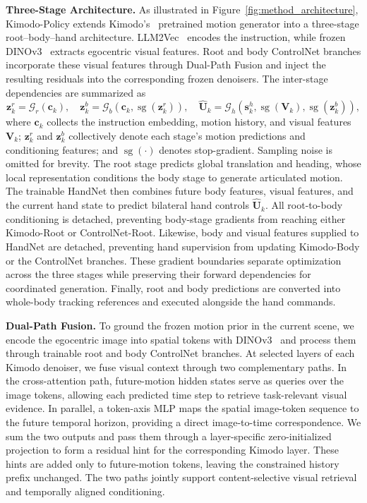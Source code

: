 \textbf{Three-Stage Architecture.}
As illustrated in Figure~\ref{fig:method_architecture}, Kimodo-Policy extends Kimodo's~\citep{kimodo} pretrained motion generator into a three-stage root--body--hand architecture.
LLM2Vec~\citep{behnamghader2024llm2veclargelanguagemodels} encodes the instruction, while frozen DINOv3~\citep{dinov3} extracts egocentric visual features.
Root and body ControlNet branches incorporate these visual features through Dual-Path Fusion and inject the resulting residuals into the corresponding frozen denoisers.
The inter-stage dependencies are summarized as
\begin{equation}
\mathbf{z}^{r}_k = \mathcal{G}_{r}(\mathbf{c}_k),
\quad
\mathbf{z}^{b}_k = \mathcal{G}_{b}\!\left(\mathbf{c}_k,\operatorname{sg}(\mathbf{z}^{r}_k)\right),
\quad
\widehat{\mathbf{U}}_k = \mathcal{G}_{h}\!\left(\mathbf{s}^{h}_k,\operatorname{sg}(\mathbf{V}_k),\operatorname{sg}(\mathbf{z}^{b}_k)\right),
\label{eq:three_stage_architecture}
\end{equation}
where $\mathbf{c}_k$ collects the instruction embedding, motion history, and visual features $\mathbf{V}_k$;
$\mathbf{z}^{r}_k$ and $\mathbf{z}^{b}_k$ collectively denote each stage's motion predictions and conditioning features;
and $\operatorname{sg}(\cdot)$ denotes stop-gradient.
Sampling noise is omitted for brevity.
The root stage predicts global translation and heading, whose local representation conditions the body stage to generate articulated motion.
The trainable HandNet then combines future body features, visual features, and the current hand state to predict bilateral hand controls $\widehat{\mathbf{U}}_k$.
All root-to-body conditioning is detached, preventing body-stage gradients from reaching either Kimodo-Root or ControlNet-Root.
Likewise, body and visual features supplied to HandNet are detached, preventing hand supervision from updating Kimodo-Body or the ControlNet branches.
These gradient boundaries separate optimization across the three stages while preserving their forward dependencies for coordinated generation.
Finally, root and body predictions are converted into whole-body tracking references and executed alongside the hand commands.

\textbf{Dual-Path Fusion.} To ground the frozen motion prior in the current scene, we encode the egocentric image into spatial tokens with DINOv3~\citep{dinov3} and process them through trainable root and body ControlNet branches. At selected layers of each Kimodo denoiser, we fuse visual context through two complementary paths. In the cross-attention path, future-motion hidden states serve as queries over the image tokens, allowing each predicted time step to retrieve task-relevant visual evidence. In parallel, a token-axis MLP maps the spatial image-token sequence to the future temporal horizon, providing a direct image-to-time correspondence. We sum the two outputs and pass them through a layer-specific zero-initialized projection to form a residual hint for the corresponding Kimodo layer. These hints are added only to future-motion tokens, leaving the constrained history prefix unchanged. The two paths jointly support content-selective visual retrieval and temporally aligned conditioning.

